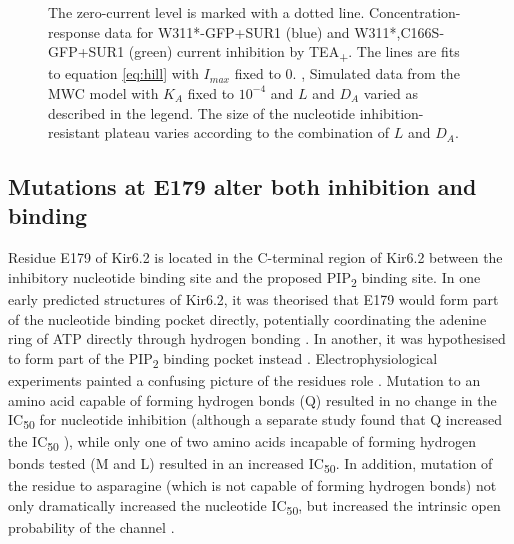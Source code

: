 \begin{figure}[h]
{	The zero-current level is marked with a dotted line.
	 Concentration-response data for W311*-GFP+SUR1 (blue) and W311*,C166S-GFP+SUR1 (green) current inhibition by TEA\textsubscript{+}.
	The lines are fits to equation \ref{eq:hill} with $I_{max}$ fixed to 0.
	,  Simulated data from the MWC model with $K_A$ fixed to $10^{-4}$ and $L$ and $D_A$ varied as described in the legend.
	The size of the nucleotide inhibition-resistant plateau varies according to the combination of $L$ and $D_A$.
	}\label{ch5fig:c166s_4}
\end{figure}

\subsection{Mutations at E179 alter both inhibition and binding}

Residue E179 of Kir6.2 is located in the C-terminal region of Kir6.2 between the inhibitory nucleotide binding site and the proposed PIP\textsubscript{2} binding site.
In one early predicted structures of Kir6.2, it was theorised that E179 would form part of the nucleotide binding pocket directly, potentially coordinating the adenine ring of ATP directly through hydrogen bonding \cite{antcliff_functional_2005}.
In another, it was hypothesised to form part of the PIP\textsubscript{2} binding pocket instead \cite{haider_identification_2007}.
Electrophysiological experiments painted a confusing picture of the residues role \cite{antcliff_functional_2005}.
Mutation to an amino acid capable of forming hydrogen bonds (Q) resulted in no change in the IC\textsubscript{50} for nucleotide inhibition (although a separate study found that Q increased the IC\textsubscript{50} \cite{proks_involvement_1999}), while only one of two amino acids incapable of forming hydrogen bonds tested (M and L) resulted in an increased IC\textsubscript{50}.
In addition, mutation of the residue to asparagine (which is not capable of forming hydrogen bonds) not only dramatically increased the nucleotide IC\textsubscript{50}, but increased the intrinsic open probability of the channel \cite{antcliff_functional_2005}.

